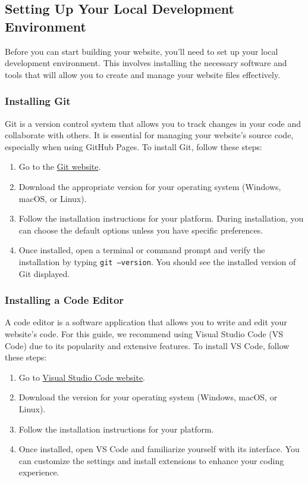 \subsection{Setting Up Your Local Development Environment}

Before you can start building your website, you'll need to set up your local development environment. This involves installing the necessary software and tools that will allow you to create and manage your website files effectively.

\subsubsection{Installing Git}
Git is a version control system that allows you to track changes in your code and collaborate with others. It is essential for managing your website's source code, especially when using GitHub Pages. To install Git, follow these steps:
\begin{enumerate}
    \item Go to the \href{https://git-scm.com/downloads}{Git website}.
    \item Download the appropriate version for your operating system (Windows, macOS, or Linux).
    \item Follow the installation instructions for your platform. During installation, you can choose the default options unless you have specific preferences.
    \item Once installed, open a terminal or command prompt and verify the installation by typing \texttt{git --version}. You should see the installed version of Git displayed.
\end{enumerate}

\subsubsection{Installing a Code Editor}
A code editor is a software application that allows you to write and edit your website's code. For this guide, we recommend using Visual Studio Code (VS Code) due to its popularity and extensive features. To install VS Code, follow these steps:
\begin{enumerate}
    \item Go to \href{https://code.visualstudio.com/}{Visual Studio Code website}.
    \item Download the version for your operating system (Windows, macOS, or Linux).
    \item Follow the installation instructions for your platform.
    \item Once installed, open VS Code and familiarize yourself with its interface. You can customize the settings and install extensions to enhance your coding experience.
\end{enumerate}

